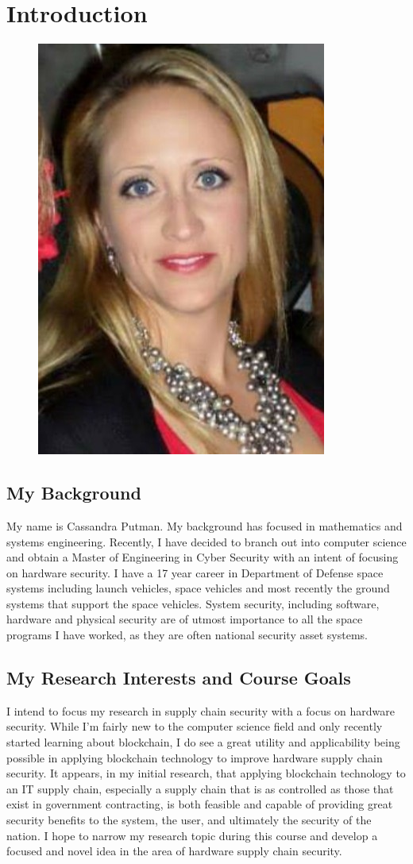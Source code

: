 \section{Introduction}
\begin{figure}
\centering
\includegraphics[scale=0.5]{putman.jpg}
\end{figure}
 \subsection{My Background}
My name is Cassandra Putman. My background has focused in mathematics and systems engineering.  Recently, I have decided to branch out into computer science and obtain a Master of Engineering in Cyber Security with an intent of focusing on hardware security.  I have a 17 year career in Department of Defense space systems including launch vehicles, space vehicles and most recently the ground systems that support the space vehicles.  System security, including software, hardware and physical security are of utmost importance to all the space programs I have worked, as they are often national security asset systems.
\subsection{My Research Interests and Course Goals}
I intend to focus my research in supply chain security with a focus on hardware security. While I'm fairly new to the computer science field and only recently started learning about blockchain, I do see a great utility and applicability being possible in applying blockchain technology to improve hardware supply chain security.  It appears, in my initial research, that applying blockchain technology to an IT supply chain, especially a supply chain that is as controlled as those that exist in government contracting, is both feasible and capable of providing great security benefits to the system, the user, and ultimately the security of the nation. I hope to narrow my research topic during this course and develop a focused and novel idea in the area of hardware supply chain security.
